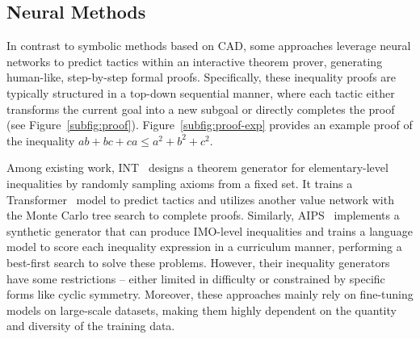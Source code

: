 \vspace{-0.3em}
\subsection{Neural Methods}
\vspace{-0.3em}
In contrast to symbolic methods based on CAD, some approaches leverage neural networks to predict tactics within an interactive theorem prover, generating human-like, step-by-step formal proofs. Specifically, these inequality proofs are typically structured in a top-down sequential manner, where each tactic either transforms the current goal into a new subgoal or directly completes the proof (see Figure~\ref{subfig:proof}). Figure~\ref{subfig:proof-exp} provides an example proof of the inequality $ab+bc+ca \leq a^2+b^2+c^2$.

Among existing work, INT~\citep{wu2021int} designs a theorem generator for elementary-level inequalities by randomly sampling axioms from a fixed set. It trains a Transformer~\citep{vaswani2017attention} model to predict tactics and utilizes another value network with the Monte Carlo tree search to complete proofs. Similarly, AIPS~\citep{wei2024proving} implements a synthetic generator that can produce IMO-level inequalities and trains a language model to score each inequality expression in a curriculum manner, performing a best-first search to solve these problems. However, their inequality generators have some restrictions -- either limited in difficulty or constrained by specific forms like cyclic symmetry. Moreover, these approaches mainly rely on fine-tuning models on large-scale datasets, making them highly dependent on the quantity and diversity of the training data.
